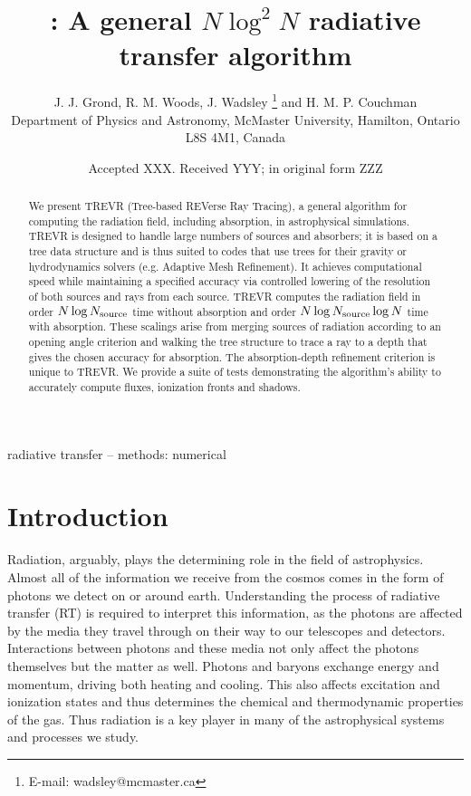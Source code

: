 \documentclass[fleq,usenatbib]{mnras}
\title[]{\acro{}: A general $N\log^2N$ radiative transfer algorithm}
\author[J. J. Grond et al.]{
J. J. Grond,
R. M. Woods,
J. Wadsley \thanks{E-mail:  wadsley@mcmaster.ca}
and H. M. P. Couchman
\\
Department of Physics and Astronomy, McMaster University, Hamilton, Ontario L8S
 4M1, Canada}
\date{Accepted XXX. Received YYY; in original form ZZZ}
\newcommand{\acro}{TREVR}
\newcommand{\NS}{N_{\rm source}}
\begin{document}
\label{firstpage}
\pagerange{\pageref{firstpage}--\pageref{lastpage}}
\maketitle

\begin{abstract}
We present \acro{} (Tree-based REVerse Ray Tracing), a general algorithm for 
computing the radiation field, including absorption, in astrophysical 
simulations. \acro{} is designed to handle large numbers of sources and 
absorbers; it is based on a tree data structure and is thus suited to 
codes that use trees for their gravity or hydrodynamics solvers (e.g. Adaptive 
Mesh Refinement). It achieves computational speed while maintaining a 
specified accuracy via controlled lowering of the resolution of both sources 
and rays from each source. \acro{} computes the radiation field in order
${N\log\NS}$ time without absorption and order ${N \log \NS \log{N}}$ time 
with absorption. These scalings arise from merging sources of radiation 
according to an opening angle criterion and walking the tree structure to 
trace a ray to a depth that gives the chosen accuracy for absorption. The 
absorption-depth refinement criterion is unique to \acro{}. We provide a suite 
of tests demonstrating the algorithm's ability to accurately compute fluxes, 
ionization fronts and shadows.   

\end{abstract}

\begin{keywords}
radiative transfer -- methods: numerical
\end{keywords}



\section{Introduction}\label{sec:intr}
Radiation, arguably, plays the determining role in the field of astrophysics. 
Almost all of the information we receive from the cosmos comes in the form of 
photons we detect on or around earth. Understanding the process of radiative 
transfer (RT) is required to interpret this information, as the photons are 
affected by the media they travel through on their way to our telescopes and 
detectors. Interactions between photons and these media not only affect the 
photons themselves but the matter as well. Photons and baryons exchange energy 
and momentum, driving both heating and cooling. This also affects excitation 
and ionization states and thus determines the chemical and thermodynamic 
properties of the gas. Thus radiation is a key player in many of the 
astrophysical systems and processes we study.
\end{document}
